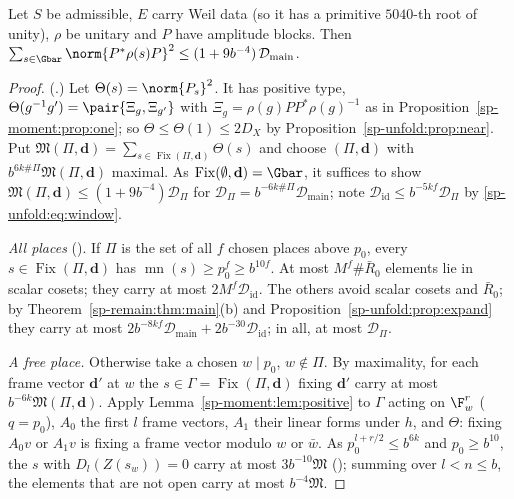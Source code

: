 \begin{theorem}
\label{sp-unfold:thm:moment}
Let $S$ be admissible, $E$ carry Weil data (so it has a primitive $5040$-th root of unity), $\rho$ be
unitary and $P$ have amplitude blocks. Then $\sum_{s\in\Gbar}\norm{P^*\rho(s)P}^2\le
(1+9b^{-4})\,\mathcal D_{\mathrm{main}}$.
\end{theorem}

\begin{proof}
(.) Let $\Theta(s)=\norm{P_s}^2$. It has positive type,
$\Theta(g^{-1}g')=\pair{\Xi_g,\Xi_{g'}}$ with $\Xi_g=\rho(g)PP^*\rho(g)^{-1}$ as in
Proposition~\ref{sp-moment:prop:one}; so $\Theta\le\Theta(1)\le2D_X$ by
Proposition~\ref{sp-unfold:prop:near}. Put $\mathfrak M(\Pi,\mathbf d)=\sum_{s\in\operatorname{Fix}(\Pi,\mathbf d)}\Theta(s)$ and
choose $(\Pi,\mathbf d)$ with $b^{6k\#\Pi}\mathfrak M(\Pi,\mathbf d)$ maximal. As $\operatorname{Fix}(\emptyset,\mathbf d)=\Gbar$, it
suffices to show $\mathfrak M(\Pi,\mathbf d)\le(1+9b^{-4})\mathcal D_\Pi$ for $\mathcal D_\Pi=b^{-6k\#\Pi}\mathcal
D_{\mathrm{main}}$; note $\mathcal D_{\mathrm{id}}\le b^{-5kf}\mathcal D_\Pi$ by \eqref{sp-unfold:eq:window}.

\emph{All places} (). If $\Pi$ is the set of all $f$
chosen places above $p_0$, every $s\in\operatorname{Fix}(\Pi,\mathbf d)$ has $\operatorname{mn}(s)\ge
p_0^f\ge b^{10f}$. At most $M^f\#\bar R_0$ elements lie in scalar cosets; they carry at most
$2M^f\mathcal D_{\mathrm{id}}$. The others avoid scalar cosets and $\bar R_0$; by
Theorem~\ref{sp-remain:thm:main}(b) and Proposition~\ref{sp-unfold:prop:expand} they carry at most
$2b^{-8kf}\mathcal D_{\mathrm{main}}+2b^{-30}\mathcal D_{\mathrm{id}}$; in all, at most $\mathcal D_\Pi$.

\emph{A free place.} Otherwise take a chosen $w\mid p_0$, $w\notin\Pi$. By maximality, for each frame
vector $\mathbf d'$ at $w$ the $s\in\Gamma=\operatorname{Fix}(\Pi,\mathbf d)$ fixing $\mathbf d'$ carry at most
$b^{-6k}\mathfrak M(\Pi,\mathbf d)$. Apply Lemma~\ref{sp-moment:lem:positive} to $\Gamma$ acting on $\F_w^r$ ($q=p_0$),
$A_0$ the first $l$ frame vectors, $A_1$ their linear forms under $h$, and $\Theta$: fixing $A_0v$
or $A_1v$ is fixing a frame vector modulo $w$ or $\bar w$. As $p_0^{l+r/2}\le b^{6k}$ and $p_0\ge
b^{10}$, the $s$ with $D_l(Z(s_w))=0$ carry at most $3b^{-10}\mathfrak M$
(); summing over $l<n\le b$, the elements that are not
open carry at most $b^{-4}\mathfrak M$.


\end{proof}
